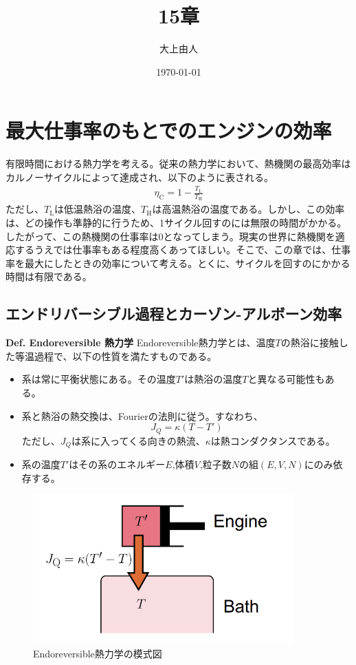 \documentclass[a4paper,10.5pt]{jsarticle}
\numberwithin{equation}{section}
\begin{document}
\title{15章}
\author{大上由人}
\date{\today}
\maketitle
\setcounter{section}{14}

\section{最大仕事率のもとでのエンジンの効率}
有限時間における熱力学を考える。従来の熱力学において、熱機関の最高効率はカルノーサイクルによって達成され、以下のように表される。
\begin{align}
  \eta_{\text{C}} = 1 - \frac{T_{\text{L}}}{T_{\text{H}}}
\end{align}
ただし、$T_{\text{L}}$は低温熱浴の温度、$T_{\text{H}}$は高温熱浴の温度である。しかし、この効率は、どの操作も準静的に行うため、1サイクル回すのには無限の時間がかかる。
したがって、この熱機関の仕事率は0となってしまう。現実の世界に熱機関を適応するうえでは仕事率もある程度高くあってほしい。そこで、この章では、仕事率を最大にしたときの効率について考える。とくに、サイクルを回すのにかかる時間は有限である。

\subsection{エンドリバーシブル過程とカーゾン-アルボーン効率}
\begin{itembox}[l]{\textbf{Def. Endoreversible 熱力学}}
  Endoreversible熱力学とは、温度$T$の熱浴に接触した等温過程で、以下の性質を満たすものである。
  \begin{itemize}
    \item 系は常に平衡状態にある。その温度$T'$は熱浴の温度$T$と異なる可能性もある。
    \item 系と熱浴の熱交換は、Fourierの法則に従う。すなわち、
    \begin{equation}
      J_{Q} = \kappa(T-T')
    \end{equation}
    ただし、$J_{Q}$は系に入ってくる向きの熱流、$\kappa$は熱コンダクタンスである。
    \item 系の温度$T'$はその系のエネルギー$E$,体積$V$,粒子数$N$の組$(E,V,N)$にのみ依存する。
  \end{itemize}
\end{itembox}

\begin{figure}[H]
    \begin{center}
    \includegraphics[width=100mm]{endoreversible.png}
    \end{center}
    \caption{Endoreversible熱力学の模式図}
    \label{fig:endoreversible}
\end{figure}
\end{document}
